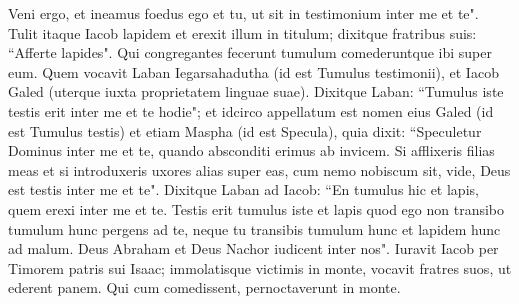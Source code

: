 \begin{biblechapter}
\verse Veni ergo, et ineamus foedus ego et tu, ut sit in testimonium inter me et te". 
\verse Tulit itaque Iacob lapidem et erexit illum in titulum; 
\verse dixitque fratribus suis: “Afferte lapides". Qui congregantes fecerunt tumulum comederuntque ibi super eum. 
\verse Quem vocavit Laban Iegarsahadutha (id est Tumulus testimonii), et Iacob Galed (uterque iuxta proprietatem linguae suae).  
\verse Dixitque Laban: “Tumulus iste testis erit inter me et te hodie"; et idcirco appellatum est nomen eius Galed (id est Tumulus testis) 
\verse et etiam Maspha (id est Specula), quia dixit: “Speculetur Dominus inter me et te, quando absconditi erimus ab invicem. 
\verse Si afflixeris filias meas et si introduxeris uxores alias super eas, cum nemo nobiscum sit, vide, Deus est testis inter me et te". 
\verse Dixitque Laban ad Iacob: “En tumulus hic et lapis, quem erexi inter me et te. 
\verse Testis erit tumulus iste et lapis quod ego non transibo tumulum hunc pergens ad te, neque tu transibis tumulum hunc et lapidem hunc ad malum. 
\verse Deus Abraham et Deus Nachor iudicent inter nos". Iuravit Iacob per Timorem patris sui Isaac; 
\verse immolatisque victimis in monte, vocavit fratres suos, ut ederent panem. Qui cum comedissent, pernoctaverunt in monte. 
\end{biblechapter}

